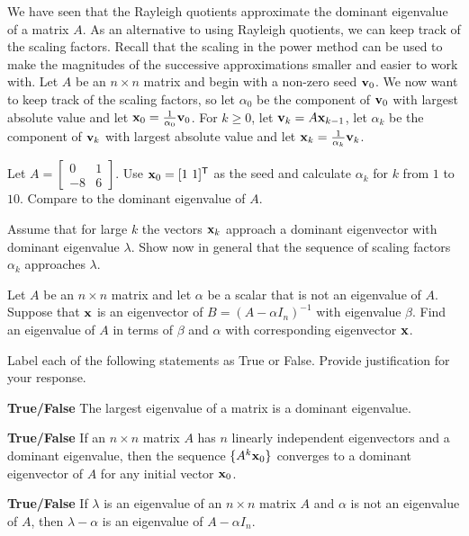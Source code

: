 \item \label{ex:4_d_dominant_eigenvalue} We have seen that the Rayleigh quotients approximate the dominant eigenvalue of a matrix $A$. As an alternative to using Rayleigh quotients, we can keep track of the scaling factors. Recall that the scaling in the power method can be used to make the magnitudes of the successive approximations smaller and easier to work with. Let $A$ be an $n \times n$ matrix and begin with a non-zero seed $\mathbf{v}_0$. We now want to keep track of the scaling factors, so let $\alpha_0$ be the component of $\mathbf{v}_0$ with largest absolute value and let $\mathbf{x}_0 = \frac{1}{\alpha_0}\mathbf{v}_0$. For $k \geq 0$, let $\mathbf{v}_k = A\mathbf{x}_{k-1}$, let $\alpha_k$ be the component of $\mathbf{v}_k$ with largest absolute value and let $\mathbf{x}_k = \frac{1}{\alpha_k}\mathbf{v}_k$. 
\ba
\item Let $A = \left[ \begin{array}{rc} 0&1 \\ -8&6 \end{array} \right]$. Use $\mathbf{x}_0 = [1 \ 1]^{\mathsf{T}}$ as the seed and calculate $\alpha_k$ for $k$ from $1$ to $10$. Compare to the dominant eigenvalue of $A$.

\item Assume that for large $k$ the vectors $\mathbf{x}_k$ approach a dominant eigenvector with dominant eigenvalue $\lambda$. Show now in general that the sequence of scaling factors $\alpha_k$ approaches $\lambda$. 

\ea

\item Let $A$ be an $n \times n$ matrix and let $\alpha$ be a scalar that is not an eigenvalue of $A$. Suppose that $\mathbf{x}$ is an eigenvector of $B = (A-\alpha I_n)^{-1}$ with eigenvalue $\beta$. Find an eigenvalue of $A$ in terms of $\beta$ and $\alpha$ with  corresponding eigenvector $\mathbf{x}$.

	
\item Label each of the following statements as True or False. Provide justification for your response.
\ba
\item \textbf{True/False} The largest eigenvalue of a matrix is a dominant eigenvalue. 

\item \textbf{True/False} If an $n \times n$ matrix $A$ has $n$ linearly independent eigenvectors and a dominant eigenvalue, then the sequence $\{A^k \mathbf{x}_0\}$ converges to a dominant eigenvector of $A$ for any initial vector $\mathbf{x}_0$. 

\item \textbf{True/False} If $\lambda$ is an eigenvalue of an $n \times n$ matrix $A$ and $\alpha$ is not an eigenvalue of $A$, then $\lambda - \alpha$ is an eigenvalue of $A - \alpha I_n$. 

